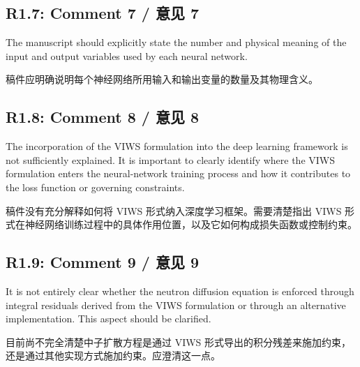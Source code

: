 \documentclass[11pt,a4paper,twoside]{article}
\begin{document}
\subsection{R1.7: Comment 7 / 意见 7}
\begin{englishcomment}
The manuscript should explicitly state the number and physical meaning of the input and output variables used by each neural network.
\end{englishcomment}
\begin{chinesecomment}
稿件应明确说明每个神经网络所用输入和输出变量的数量及其物理含义。
\end{chinesecomment}
\begin{revisionidea}
\end{revisionidea}

\subsection{R1.8: Comment 8 / 意见 8}
\begin{englishcomment}
The incorporation of the VIWS formulation into the deep learning framework is not sufficiently explained. It is important to clearly identify where the VIWS formulation enters the neural-network training process and how it contributes to the loss function or governing constraints.
\end{englishcomment}
\begin{chinesecomment}
稿件没有充分解释如何将 VIWS 形式纳入深度学习框架。需要清楚指出 VIWS 形式在神经网络训练过程中的具体作用位置，以及它如何构成损失函数或控制约束。
\end{chinesecomment}
\begin{revisionidea}
\end{revisionidea}

\subsection{R1.9: Comment 9 / 意见 9}
\begin{englishcomment}
It is not entirely clear whether the neutron diffusion equation is enforced through integral residuals derived from the VIWS formulation or through an alternative implementation. This aspect should be clarified.
\end{englishcomment}
\begin{chinesecomment}
目前尚不完全清楚中子扩散方程是通过 VIWS 形式导出的积分残差来施加约束，还是通过其他实现方式施加约束。应澄清这一点。
\end{chinesecomment}
\begin{revisionidea}
\end{revisionidea}
\end{document}
